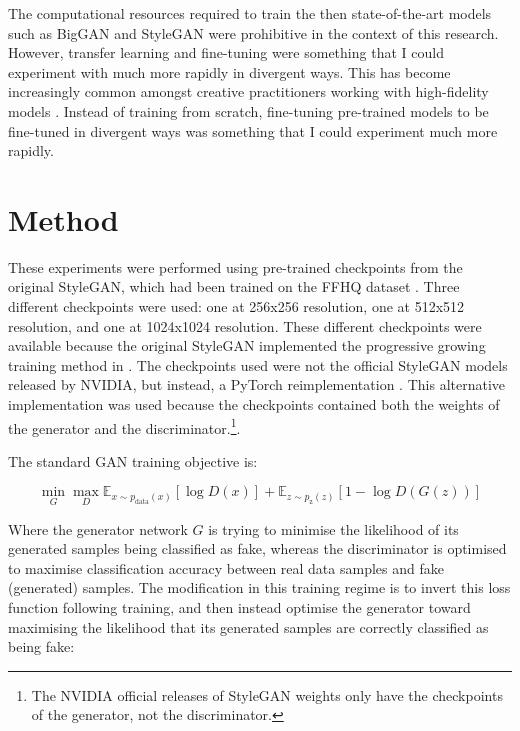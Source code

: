 The computational resources required to train the then state-of-the-art models such as BigGAN \citep{brock2018large} and StyleGAN \citep{karras2019style} were prohibitive in the context of this research. 
However, transfer learning and fine-tuning were something that I could experiment with much more rapidly in divergent ways. 
This has become increasingly common amongst creative practitioners working with high-fidelity models \citep{berns2020bridging}. 
Instead of training from scratch, fine-tuning pre-trained models to be fine-tuned in divergent ways was something that I could experiment much more rapidly. 

\section{Method}
\label{c4:sec:method}

These experiments were performed using pre-trained checkpoints from the original StyleGAN, which had been trained on the FFHQ dataset \citep{karras2019style}. 
Three different checkpoints were used: one at 256x256 resolution, one at 512x512 resolution, and one at 1024x1024 resolution. 
These different checkpoints were available because the original StyleGAN implemented the progressive growing training method in \citep{karras2017progressive}.
The checkpoints used were not the official StyleGAN models released by NVIDIA, but instead, a PyTorch reimplementation \citep{rosinality2019style}.
This alternative implementation was used because the checkpoints contained both the weights of the generator and the discriminator.\footnote{The NVIDIA official releases of StyleGAN weights only have the checkpoints of the generator, not the discriminator.}.

The standard GAN training objective is:

\begin{equation} 
\min_{G}\max_{D}\mathbb{E}_{x\sim p_{\text{data}}(x)}[\log{D(x)}] +  \mathbb{E}_{z\sim p_{\text{z}}(z)}[1 - \log{D(G(z))}]
\end{equation}

Where the generator network $G$ is trying to minimise the likelihood of its generated samples being classified as fake, whereas the discriminator is optimised to maximise classification accuracy between real data samples and fake (generated) samples.
The modification in this training regime is to invert this loss function following training, and then instead optimise the generator toward maximising the likelihood that its generated samples are correctly classified as being fake:

